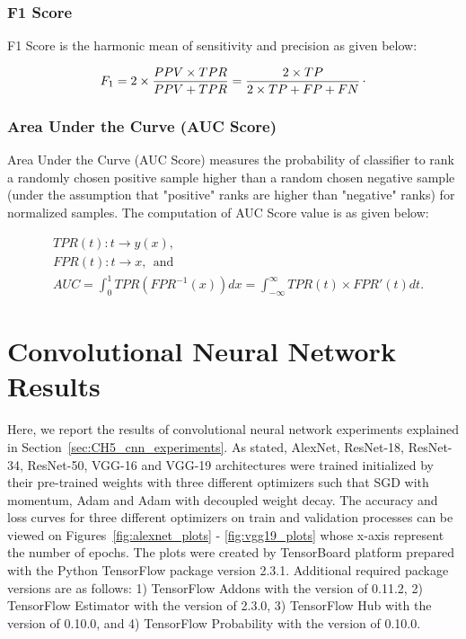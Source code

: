 \subsubsection{F1 Score}

F1 Score is the harmonic mean of sensitivity and precision as given below:

\begin{equation}
\label{eq:F1_Score}
    F_{1} = 2 \times \frac{PPV \times TPR}{PPV + TPR} = \frac{2 \times TP}{2 \times TP + FP + FN}\raisepunct{.}
\end{equation}

\subsubsection{Area Under the Curve (AUC Score)}

Area Under the Curve (AUC Score) measures the probability of classifier to rank a randomly chosen positive sample higher than a random chosen negative sample (under the assumption that "positive" ranks are higher than "negative" ranks) for normalized samples. The computation of AUC Score value is as given below:

\begin{align}
\label{eq:AUC_Score}
    \nonumber
    & TPR(t) : t \rightarrow y \left ( x \right ), \\
    \nonumber
    & FPR(t) : t \rightarrow x, \:\: \text{and} \\ 
    & AUC = \int_{0}^{1} TPR \left ( FPR^{-1}\left ( x \right ) \right ) dx = \int_{-\infty}^{\infty} TPR \left ( t \right ) \times {FPR}' \left ( t \right ) dt.
\end{align}

\section{Convolutional Neural Network Results}

Here, we report the results of convolutional neural network experiments explained in Section~\ref{sec:CH5_cnn_experiments}. As stated, AlexNet, ResNet-18, ResNet-34, ResNet-50, VGG-16 and VGG-19 architectures were trained initialized by their pre-trained weights with three different optimizers such that SGD with momentum, Adam and Adam with decoupled weight decay. The accuracy and loss curves for three different optimizers on train and validation processes can be viewed on Figures~\ref{fig:alexnet_plots} - \ref{fig:vgg19_plots} whose x-axis represent the number of epochs. The plots were created by TensorBoard platform prepared with the Python TensorFlow package version 2.3.1. Additional required package versions are as follows: 1) TensorFlow Addons with the version of 0.11.2, 2) TensorFlow Estimator with the version of 2.3.0, 3) TensorFlow Hub with the version of 0.10.0, and 4) TensorFlow Probability with the version of 0.10.0.


